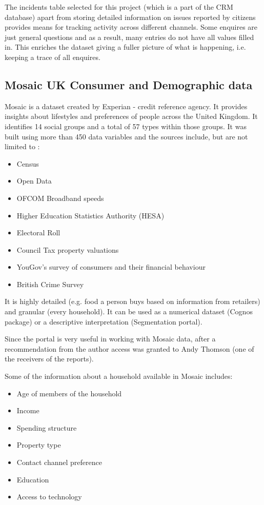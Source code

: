 The incidents table selected for this project (which is a part of the CRM database) apart from storing detailed information on issues reported by citizens provides means for tracking activity across different channels. Some enquires are just general questions and as a result, many entries do not have all values filled in. This enriches the dataset giving a fuller picture of what is happening, i.e. keeping a trace of all enquires.		
		
		\subsection{Mosaic UK Consumer and Demographic data}
		
Mosaic is a dataset created by Experian - credit reference agency. It provides insights about lifestyles and preferences of people across the United Kingdom. It identifies 14 social groups and a total of 57 types within those groups. It was built using more than 450 data variables and the sources include, but are not limited to \citep{Experian2014}:	

\begin{itemize}
\item Census
\item Open Data
\item OFCOM Broadband speeds
\item Higher Education Statistics Authority (HESA)
\item Electoral Roll
\item Council Tax property valuations
\item YouGov's survey of consumers and their financial behaviour
\item British Crime Survey
\end{itemize}

It is highly detailed (e.g. food a person buys based on information from retailers) and granular (every household). It can be used as a numerical dataset (Cognos package) or a descriptive interpretation (Segmentation portal).

Since the portal is very useful in working with Mosaic data, after a recommendation from the author access was granted to Andy Thomson (one of the receivers of the reports).

Some of the information about a household available in Mosaic includes:

\begin{itemize}
\item Age of members of the household
\item Income
\item Spending structure
\item Property type
\item Contact channel preference
\item Education
\item Access to technology
\end{itemize}
	
